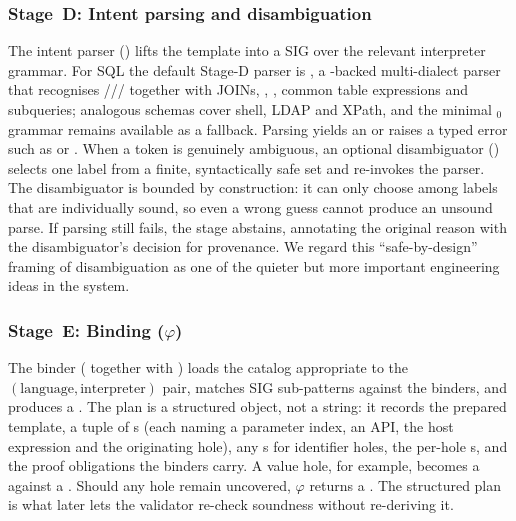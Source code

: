 \subsubsection{Stage~D: Intent parsing and disambiguation}
The intent parser () lifts the template into a SIG over
the relevant interpreter grammar. For SQL the default Stage-D parser is
, a -backed multi-dialect parser that recognises
/// together with JOINs,
, , common table expressions and subqueries;
analogous schemas cover shell, LDAP and XPath, and the minimal $_0$
grammar remains available as a fallback. Parsing yields an  or
raises a typed error such as  or
.
When a token is genuinely ambiguous, an optional disambiguator
() selects one label from a finite, syntactically safe
set and re-invokes the parser. The disambiguator is bounded by
construction: it can only choose among labels that are individually sound,
so even a wrong guess cannot produce an unsound parse. If parsing still
fails, the stage abstains, annotating the original reason with the
disambiguator's decision for provenance. We regard this ``safe-by-design''
framing of disambiguation as one of the quieter but more important
engineering ideas in the system.

\subsubsection{Stage~E: Binding ($\varphi$)}
The binder ( together with ) loads the
catalog appropriate to the $(\text{language},\text{interpreter})$ pair,
matches SIG sub-patterns against the binders, and produces a
. The plan is a structured object, not a string: it records
the prepared template, a tuple of s (each naming a
parameter index, an API, the host expression and the originating hole), any
s for identifier holes, the per-hole
s, and the proof obligations the binders carry. A
value hole, for example, becomes a  against a
. Should any hole remain uncovered, $\varphi$
returns a . The structured plan is what later lets the
validator re-check soundness without re-deriving it.

